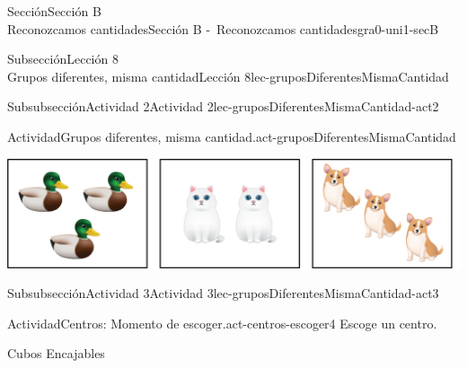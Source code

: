 \begin{sectionptx}{Sección}{{\Large Sección B\\}Reconozcamos cantidades}{}{Sección B -~Reconozcamos cantidades}{}{}{gra0-uni1-secB}
\begin{subsectionptx}{Subsección}{{\normalsize Lección 8\\[-0.05cm]}Grupos diferentes, misma cantidad}{}{Lección 8}{}{}{lec-gruposDiferentesMismaCantidad}
%
%
\typeout{************************************************}
\typeout{************************************************}
%
\begin{subsubsectionptx}{Subsubsección}{Actividad 2}{}{Actividad 2}{}{}{lec-gruposDiferentesMismaCantidad-act2}
\begin{activity}{Actividad}{Grupos diferentes, misma cantidad.}{act-gruposDiferentesMismaCantidad}%
\begin{image}{0}{1}{0}{}%
\includegraphics[max width=\linewidth, center]{external/png-source/K.1.C Beta Student Workbook.AnimalGroups.png}
\end{image}%
%
\end{activity}%
\end{subsubsectionptx}
%
%
\typeout{************************************************}
\typeout{************************************************}
%
\clearpage
\begin{subsubsectionptx}{Subsubsección}{Actividad 3}{}{Actividad 3}{}{}{lec-gruposDiferentesMismaCantidad-act3}
\begin{activity}{Actividad}{Centros: Momento de escoger.}{act-centros-escoger4}%
Escoge un centro.%
\begin{sidebyside}{2}{0.025}{0.025}{0.05}%
\begin{sbspanel}{0.45}%
Cubos Encajables%
\par

\end{sbspanel}
\end{sidebyside}
\end{activity}
\end{subsubsectionptx}
\end{subsectionptx}
\end{sectionptx}
